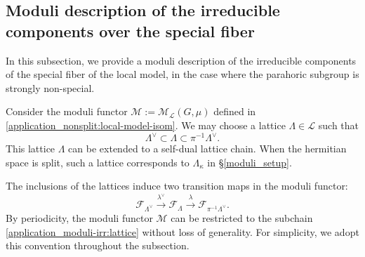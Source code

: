 \documentclass[pdflatex,sn-mathphys-num]{sn-jnl}%
\theoremstyle{thmstyleone}%
\theoremstyle{thmstyletwo}%
\numberwithin{equation}{subsection}
\theoremstyle{thmstylethree}%
\newcommand{\CF}{\ensuremath{\mathcal{F}}\xspace}
\newcommand{\CL}{\ensuremath{\mathcal{L}}\xspace}
\newcommand{\CM}{\ensuremath{\mathcal{M}}\xspace}
\begin{document}
\subsection{Moduli description of the irreducible components over the special fiber}\label{application_moduli-irr}
In this subsection, we provide a moduli description of the irreducible components of the special fiber of the local model, in the case where the parahoric subgroup is strongly non-special.

Consider the moduli functor $\CM:=\CM_\CL(G,\mu)$ defined in \eqref{application_nonsplit:local-model-isom}. We may choose a lattice $\Lambda\in \CL$ such that
\begin{equation}\label{application_moduli-irr:lattice}
    \Lambda^\vee\subset \Lambda\subset\pi^{-1}\Lambda^\vee.
\end{equation}
This lattice $\Lambda$ can be extended to a self-dual lattice chain. When the hermitian space is split, such a lattice corresponds to $\Lambda_\kappa$ in \S \ref{moduli_setup}.

The inclusions of the lattices induce two transition maps in the moduli functor:
\begin{equation}\label{application_moduli-irr:trans}
    \CF_{\Lambda^\vee}\xrightarrow{\lambda^\vee}\CF_\Lambda\xrightarrow{\lambda}\CF_{\pi^{-1}\Lambda^\vee}.
\end{equation}
By periodicity, the moduli functor $\CM$ can be restricted to the subchain \eqref{application_moduli-irr:lattice} without loss of generality. For simplicity, we adopt this convention throughout the subsection.
\end{document}
